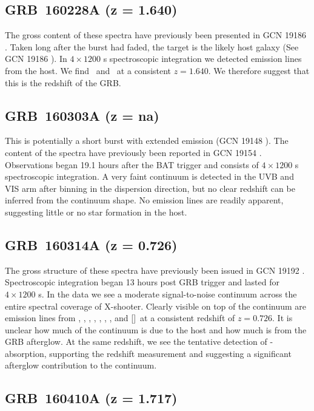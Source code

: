 \documentclass{aa}    %
\begin{document}
\subsection{GRB~160228A (z = 1.640)} \label{160228}

The gross content of these spectra have previously been presented in GCN 19186
\citep{GCN19186}. Taken long after the burst had faded, the target is the likely
host galaxy (See GCN 19186 \citep{GCN19186}). In $4\times1200$ s spectroscopic
integration we detected emission lines from the host. We find \oiii~and \ha~at a
consistent $z = 1.640$.  We therefore suggest that this is the redshift of the
GRB.

\subsection{GRB~160303A (z = na)} \label{160303}

This is potentially a short burst with extended emission (GCN 19148
\citep{GCN19148}). The content of the spectra have previously been reported in
GCN 19154 \citep{GCN19154}. Observations began 19.1 hours after the BAT trigger
and consists of $4\times 1200$ s spectroscopic integration. A very faint
continuum is detected in the UVB and VIS arm after binning in the dispersion
direction, but no clear redshift can be inferred from the continuum shape. No
emission lines are readily apparent, suggesting little or no star formation in
the host.


\subsection{GRB~160314A (z = 0.726)} \label{160314}

The gross structure of these spectra have previously been issued in GCN 19192
\citep{GCN19192}. Spectroscopic integration began 13 hours post GRB trigger and
lasted for $4 \times 1200$ s. In the data we see a moderate signal-to-noise
continuum across the entire spectral coverage of X-shooter. Clearly visible on
top of the continuum are emission lines from \oii, \hd, \hg, \hb, \oiii, \ha,
\nii, and [\sii]~at a consistent redshift of $z = 0.726$. It is unclear how much
of the continuum is due to the host and how much is from the GRB afterglow. At
the same redshift, we see the tentative detection of \feii-absorption,
supporting the redshift measurement and suggesting a significant afterglow
contribution to the continuum.

\subsection{GRB~160410A (z = 1.717)}\label{160410}
\end{document}
